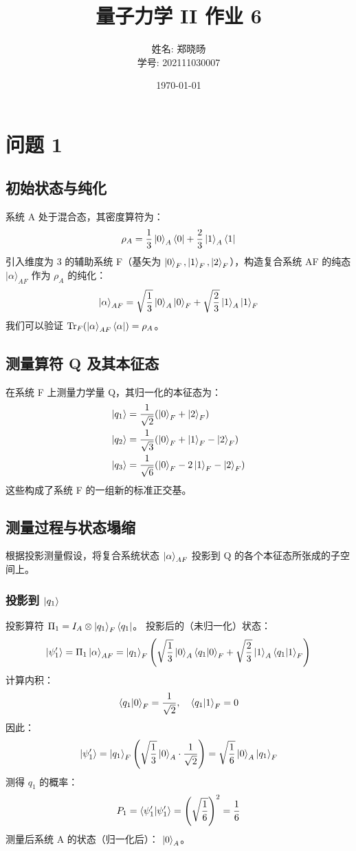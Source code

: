 \documentclass[12pt, a4paper]{article}
\begin{document}
\title{量子力学 II 作业 6}
\author{姓名: 郑晓旸 \\ 学号: 202111030007}
\date{ \today}
\maketitle
\section*{问题 1}

\subsection*{初始状态与纯化}
系统 A 处于混合态，其密度算符为：
\[ \rho_A = \frac{1}{3}\ket{0}_A\bra{0} + \frac{2}{3}\ket{1}_A\bra{1} \]
引入维度为 3 的辅助系统 F（基矢为 \(\ket{0}_F, \ket{1}_F, \ket{2}_F\)），构造复合系统 AF 的纯态 \(|\alpha\rangle_{AF}\) 作为 \(\rho_A\) 的纯化：
\[ \ket{\alpha}_{AF} = \sqrt{\frac{1}{3}}\ket{0}_A \ket{0}_F + \sqrt{\frac{2}{3}}\ket{1}_A \ket{1}_F \]
我们可以验证 \(\text{Tr}_F(\ket{\alpha}_{AF}\bra{\alpha}) = \rho_A\)。

\subsection*{测量算符 Q 及其本征态}
在系统 F 上测量力学量 Q，其归一化的本征态为：
\begin{align*}
\ket{q_1} &= \frac{1}{\sqrt{2}}(\ket{0}_F + \ket{2}_F) \\
\ket{q_2} &= \frac{1}{\sqrt{3}}(\ket{0}_F + \ket{1}_F - \ket{2}_F) \\
\ket{q_3} &= \frac{1}{\sqrt{6}}(\ket{0}_F - 2\ket{1}_F - \ket{2}_F)
\end{align*}
这些构成了系统 F 的一组新的标准正交基。

\subsection*{测量过程与状态塌缩}
根据投影测量假设，将复合系统状态 \(\ket{\alpha}_{AF}\) 投影到 Q 的各个本征态所张成的子空间上。

\subsubsection*{投影到 \(\ket{q_1}\)}
投影算符 \(\Pi_1 = I_A \otimes \ket{q_1}_F\bra{q_1}\)。
投影后的（未归一化）状态：
\[ \ket{\psi'_1} = \Pi_1 \ket{\alpha}_{AF} = \ket{q_1}_F \left( \sqrt{\frac{1}{3}}\ket{0}_A \braket{q_1|0}_F + \sqrt{\frac{2}{3}}\ket{1}_A \braket{q_1|1}_F \right) \]
计算内积：
\[ \braket{q_1|0}_F = \frac{1}{\sqrt{2}}, \quad \braket{q_1|1}_F = 0 \]
因此：
\[ \ket{\psi'_1} = \ket{q_1}_F \left( \sqrt{\frac{1}{3}}\ket{0}_A \cdot \frac{1}{\sqrt{2}} \right) = \sqrt{\frac{1}{6}} \ket{0}_A \ket{q_1}_F \]
测得 \(q_1\) 的概率：
\[ P_1 = \braket{\psi'_1|\psi'_1} = \left(\sqrt{\frac{1}{6}}\right)^2 = \frac{1}{6} \]
测量后系统 A 的状态（归一化后）： \(\ket{0}_A\)。
\end{document}

